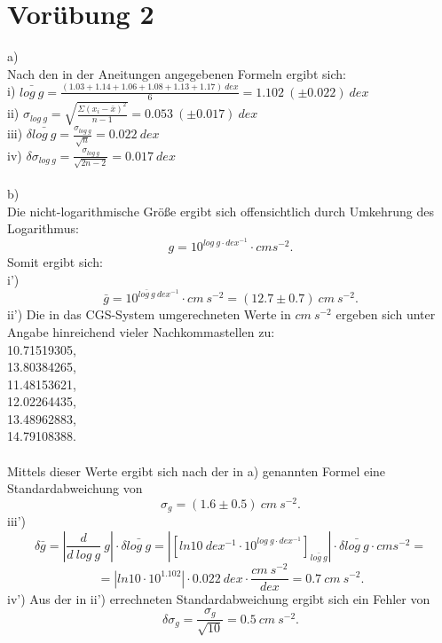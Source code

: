 \documentclass[titlepage]{scrartcl}
\begin{document}
\section{Vorübung 2}
a) \\
Nach den in der Aneitungen angegebenen Formeln ergibt sich: \\
i) $ \bar{log\ g} = \frac{(1.03 + 1.14 + 1.06 + 1.08 + 1.13 + 1.17) \ dex }{6} = 1.102\ (\pm 0.022) \ dex $  \\
ii) $\sigma_{log\ g} = \sqrt{\frac{\Sigma(x_i - \bar{x})^2}{n-1}} = 0.053\ (\pm 0.017) \ dex $ \\
iii) $\delta \bar{log\ g} = \frac{\sigma_{log\ g}}{\sqrt{n}}  = 0.022 \ dex $ \\
iv)  $ \delta \sigma_{log\ g} = \frac{\sigma_{log\ g}}{\sqrt{2n-2}} = 0.017 \ dex $ \\ \\
b) \\
Die nicht-logarithmische Größe ergibt sich offensichtlich durch Umkehrung des Logarithmus: 
\begin{equation}
g = 10^{log\ g\cdot dex^{-1}} \cdot cm s ^{-2}.
\nonumber
\end{equation} 
Somit ergibt sich: \\
i') 
\begin{equation}
 \bar{g} = 10^{\bar{log\ g} \ dex^{-1}} \cdot cm\ s^{-2} = (12.7 \pm 0.7)\ cm\ s^{-2}. 
 \nonumber
\end{equation}
ii') Die in das CGS-System umgerechneten Werte in $cm\ s^{-2} $ ergeben sich unter Angabe hinreichend vieler Nachkommastellen zu: \\
10.71519305, \\
13.80384265, \\
11.48153621, \\
12.02264435, \\
13.48962883, \\
14.79108388. \\ \\
Mittels dieser Werte ergibt sich nach der in a) genannten Formel eine Standardabweichung von 
\begin{equation}
\sigma_{g} = (1.6 \pm 0.5)\ cm\ s^{-2}.
\nonumber
\end{equation}
iii') 
\begin{equation}
\delta \bar{g} = |\frac{d}{d\ log\ g}\ g| \cdot \delta \bar{log\ g} = |[ln{10}\ dex^{-1} \cdot 10^{log\ g\cdot dex^{-1}}]_{\bar{log\ g}}| \cdot \delta \bar{log\ g}\cdot cm s ^{-2} =
\nonumber 
\end{equation}
\begin{equation}
= |ln{10} \cdot 10^{1.102}| \cdot 0.022 \ dex \cdot \frac{cm\ s^{-2}}{dex}  = 0.7\  cm\ s^{-2}.
\nonumber
\end{equation}
iv') Aus der in ii') errechneten Standardabweichung ergibt sich ein Fehler von 
\begin{equation}
\delta \sigma_{g} = \frac{\sigma_{g}}{\sqrt{10}} = 0.5 \ cm\ s^{-2}. 
\nonumber
\end{equation}
\end{document}

